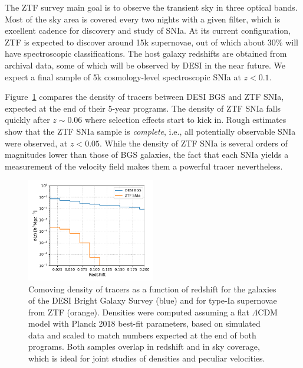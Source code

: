 The ZTF survey main goal is to observe the transient sky in three optical bands. 
Most of the sky area is covered every two nights with a given filter, which is excellent cadence 
for discovery and study of SNIa. 
At its current configuration, ZTF is expected to discover around 15k supernovae, 
out of which about 30\% will have spectroscopic classifications. 
The host galaxy redshifts are obtained from archival data, some of which will be observed by DESI 
in the near future. We expect a final sample of 5k cosmology-level spectroscopic SNIa at  
$z < 0.1$. 

Figure~\ref{fig:nz_desi_ztf} compares the density of tracers between DESI BGS and ZTF SNIa, expected at 
the end of their 5-year programs. The density of ZTF SNIa falls quickly after $z \sim 0.06$ where 
selection effects start to kick in. Rough estimates show that the ZTF SNIa sample is \emph{complete},
i.e., all potentially observable SNIa were observed, at $z < 0.05$. 
While the density of ZTF SNIa is several orders of magnitudes lower 
than those of BGS galaxies, the fact that each SNIa yields a measurement of the velocity field 
makes them a powerful tracer nevertheless. 

\begin{figure}
    \centering
    \includegraphics[width=0.5\textwidth]{fig/velocities/nz_desi_ztf.pdf}
    \caption{Comoving density of tracers as a function of redshift for the galaxies of 
    the DESI Bright Galaxy Survey (blue) and for type-Ia supernovae from ZTF (orange).
    Densities were computed assuming a flat $\Lambda$CDM model with 
    Planck 2018 best-fit parameters, based on simulated data and scaled to 
    match numbers expected at the end of both programs. 
    Both samples overlap in redshift and in sky coverage, which is ideal for joint studies 
    of densities and peculiar velocities. 
    }
    \label{fig:nz_desi_ztf}
\end{figure}


